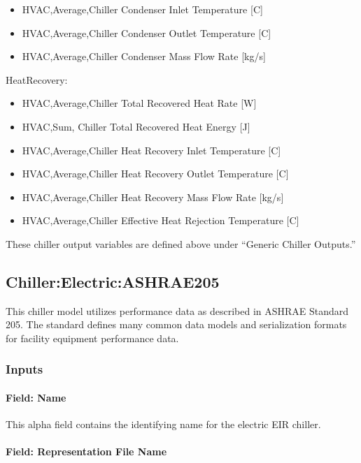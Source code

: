 \begin{itemize}
    \item
    HVAC,Average,Chiller Condenser Inlet Temperature {[}C{]}
    \item
    HVAC,Average,Chiller Condenser Outlet Temperature {[}C{]}
    \item
    HVAC,Average,Chiller Condenser Mass Flow Rate {[}kg/s{]}
\end{itemize}

HeatRecovery:

\begin{itemize}
    \item
    HVAC,Average,Chiller Total Recovered Heat Rate {[}W{]}
    \item
    HVAC,Sum, Chiller Total Recovered Heat Energy {[}J{]}
    \item
    HVAC,Average,Chiller Heat Recovery Inlet Temperature {[}C{]}
    \item
    HVAC,Average,Chiller Heat Recovery Outlet Temperature {[}C{]}
    \item
    HVAC,Average,Chiller Heat Recovery Mass Flow Rate {[}kg/s{]}
    \item
    HVAC,Average,Chiller Effective Heat Rejection Temperature {[}C{]}
\end{itemize}

These chiller output variables are defined above under ``Generic Chiller Outputs.''

\subsection{Chiller:Electric:ASHRAE205}\label{chillerelectricashrae205}

This chiller model utilizes performance data as described in ASHRAE Standard 205. The standard defines many common data models and serialization formats for facility equipment performance data.

\subsubsection{Inputs}

\paragraph{Field: Name}

This alpha field contains the identifying name for the electric EIR chiller.

\paragraph{Field: Representation File Name}\label{field-chiller205-representation-file-name}

